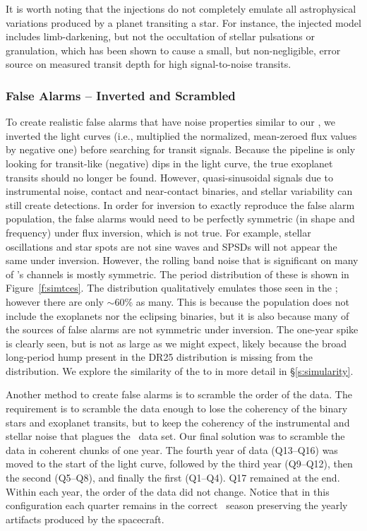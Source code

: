 {\color{blue}It is worth noting that the injections do not completely emulate all astrophysical variations produced by a planet transiting a star.  For instance, the injected model includes limb-darkening, but not the occultation of stellar pulsations or granulation, which has been shown to cause a small, but non-negligible, error source on measured transit depth \citep{Chiavassa2017} for high signal-to-noise transits.  }


\subsubsection{False Alarms -- Inverted and Scrambled} 

To create realistic false alarms that have noise properties similar to our , we inverted the light curves (i.e., multiplied the normalized, mean-zeroed flux values by negative one) before searching for transit signals. Because the pipeline is only looking for transit-like (negative) dips in the light curve, the true exoplanet transits should no longer be found. However, quasi-sinusoidal signals due to instrumental noise, contact and near-contact binaries, and stellar variability can still create detections. In order for inversion to exactly reproduce the false alarm population, the false alarms would need to be perfectly symmetric (in shape and frequency) under flux inversion, which is not true. For example, stellar oscillations and star spots are not sine waves and SPSDs will not appear the same under inversion. However, the rolling band noise that is significant on many of \Kepler's channels is mostly symmetric.  The period distribution of these  is shown in Figure~\ref{f:simtces}. The distribution qualitatively emulates those seen in the ; however there are only $\sim$60\% as many.  This is because the population does not include the exoplanets nor the eclipsing binaries, but it is also because many of the sources of false alarms are not symmetric under inversion.  The one-year spike is clearly seen, but is not as large as we might expect, likely because the broad long-period hump present in the DR25 \opstce{} distribution is missing from the \invtce{} distribution. We explore the similarity of the  to  in more detail in \S\ref{s:simularity}.

Another method to create false alarms is to scramble the order of the data. The requirement is to scramble the data enough to lose the coherency of the binary stars and exoplanet transits, but to keep the coherency of the instrumental and stellar noise that plagues the \Kepler\ data set. Our final solution was to scramble the data in coherent chunks of one year. The fourth year of data (Q13--Q16) was moved to the start of the light curve, followed by the third year (Q9--Q12), then the second (Q5--Q8), and finally the first (Q1--Q4). Q17 remained at the end. Within each year, the order of the data did not change. Notice that in this configuration each quarter remains in the correct \Kepler\ season preserving the yearly artifacts produced by the spacecraft. 

